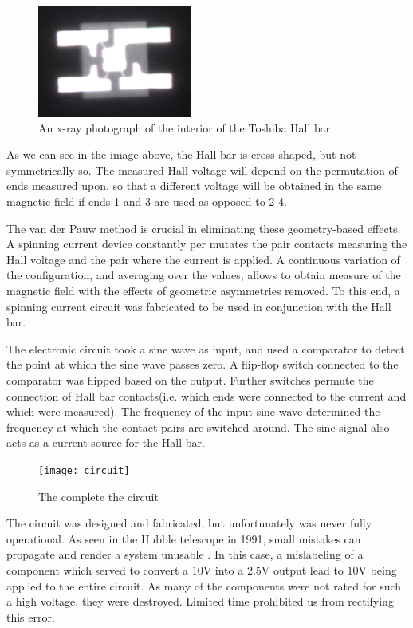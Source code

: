 \documentclass[journal]{IEEEtran}
\begin{document}
\begin{figure}[H]
\centering
\includegraphics[width=0.45\textwidth]{hallbar}
\caption{An x-ray photograph of the interior of the Toshiba Hall bar}
\end{figure}

As we can see in the image above, the Hall bar is cross-shaped, but not symmetrically so. The measured Hall voltage will depend on the permutation of ends measured upon, so that a different voltage will be obtained in the same magnetic field if ends 1 and 3 are used as opposed to 2-4.

The van der Pauw method \cite{pauw} is crucial in eliminating these geometry-based effects. A spinning current device \cite{steiner} constantly per mutates the pair contacts measuring the Hall voltage and the pair where the current is applied. A continuous variation of the configuration, and averaging over the values, allows to obtain measure of the magnetic field with the effects of geometric asymmetries removed. To this end, a spinning current circuit was fabricated to be used in conjunction with the Hall bar.

The electronic circuit took a sine wave as input, and used a comparator to detect the point at which the sine wave passes zero. A flip-flop switch connected to the comparator was flipped based on the output. Further switches permute the connection of Hall bar contacts(i.e. which ends were connected to the current and which were measured). The frequency of the input sine wave determined the frequency at which the contact pairs are switched around. The sine signal also acts as a current source for the Hall bar. 

\begin{figure}[H]
\centering
\texttt{[image: circuit]}
\caption{The complete the circuit}
\end{figure}

The circuit was designed and fabricated, but unfortunately was never fully operational. As seen in the Hubble telescope in 1991, small mistakes can propagate and render a system unusable \cite{hubble}. In this case, a mislabeling of a component which served to convert a 10V into a 2.5V output lead to 10V being applied to the entire circuit. As many of the components were not rated for such a high voltage, they were destroyed. Limited time prohibited us from rectifying this error.
\end{document}
